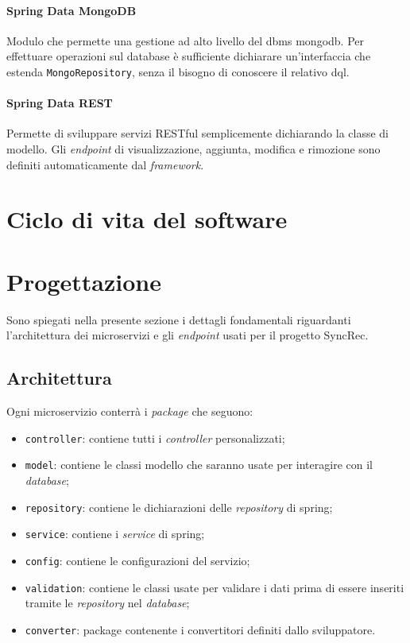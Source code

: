 \paragraph*{Spring Data MongoDB} Modulo che permette una gestione ad alto livello del \acrshort{dbms} \gls{mongodb}.
Per effettuare operazioni sul database è sufficiente dichiarare un'interfaccia che estenda \texttt{MongoRepository}, senza il bisogno di conoscere il relativo \gls{dql}.

\paragraph*{Spring Data REST} Permette di sviluppare servizi RESTful semplicemente dichiarando la classe di modello.
Gli \textit{endpoint} di visualizzazione, aggiunta, modifica e rimozione sono definiti automaticamente dal \textit{framework}.

\section{Ciclo di vita del software}
\label{sec:ciclo-vita-software}

\section{Progettazione}\label{sec:progettazione}

Sono spiegati nella presente sezione i dettagli fondamentali riguardanti l'architettura dei microservizi e gli \textit{endpoint} usati per il progetto SyncRec.

\subsection{Architettura}
Ogni \gls{microservizio} conterrà i \textit{package} che seguono:

\begin{itemize}
	\item \texttt{controller}: contiene tutti i \textit{controller} personalizzati;
	\item \texttt{model}: contiene le classi modello che saranno usate per interagire con il \textit{database};
	\item \texttt{repository}: contiene le dichiarazioni delle \textit{repository} di \gls{spring};
	\item \texttt{service}: contiene i \textit{service} di \gls{spring};
	\item \texttt{config}: contiene le configurazioni del servizio;
	\item \texttt{validation}: contiene le classi usate per validare i dati prima di essere inseriti tramite le \textit{repository} nel \textit{database};
	\item \texttt{converter}: package contenente i convertitori definiti dallo sviluppatore.
\end{itemize}

